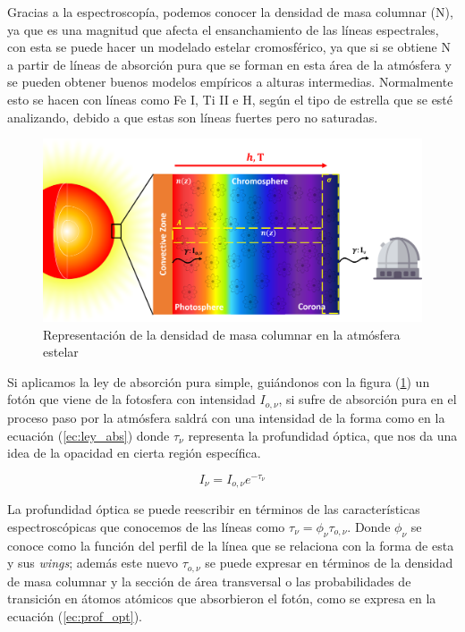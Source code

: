\documentclass[12pt,oneside,openany,letter]{book}
\begin{document}
\noindent Gracias a la espectroscopía, podemos conocer la densidad de masa columnar (N), ya que es una magnitud que afecta el ensanchamiento de las líneas espectrales, con esta se puede hacer un modelado estelar cromosférico, ya que si se obtiene N a partir de líneas de absorción pura que se forman en esta área de la atmósfera y se pueden obtener buenos modelos empíricos a alturas intermedias. Normalmente esto se hacen con líneas como Fe I, Ti II e H, según el tipo de estrella que se esté analizando, debido a que estas son líneas fuertes pero no saturadas. %

\begin{figure}[h]
    \centering
    \includegraphics[width=1\linewidth]{Images/densidad_masa (2).png}
    \caption{Representación de la densidad de masa columnar en la atmósfera estelar}
    \label{fig:rep_dens_masa}
\end{figure}

Si aplicamos la ley de absorción pura simple, guiándonos con la figura (\ref{fig:rep_dens_masa}) un fotón que viene de la fotosfera con intensidad $I_{o, \nu}$, si sufre de absorción pura en el proceso paso por la atmósfera saldrá con una intensidad de la forma como en la ecuación (\ref{ec:ley_abs}) donde $\tau_{\nu}$ representa la profundidad óptica, que nos da una idea de la opacidad en cierta región específica.

\begin{equation}
    I_{\nu} = I_{o,\nu} e^{- \tau_{\nu}}
    \label{ec:ley_abs}
\end{equation}

La profundidad óptica se puede reescribir en términos de las características espectroscópicas que conocemos de las líneas como $\tau_{\nu} = \phi_{\nu} \tau_{o, \nu}$. Donde $\phi_{\nu}$ se conoce como la función del perfil de la línea que se relaciona con la forma de esta y sus \textit{wings}; además este nuevo $\tau_{o, \nu}$ se puede expresar en términos de la densidad de masa columnar y la sección de área transversal o las probabilidades de transición en átomos atómicos que absorbieron el fotón, como se expresa en la ecuación (\ref{ec:prof_opt}).
\end{document}
